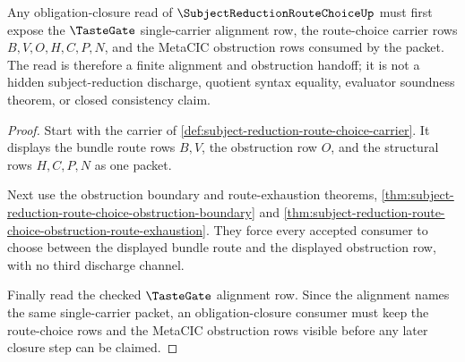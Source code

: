 \begin{theorem}
\label{thm:subject-reduction-route-choice-tastegate-obligation-handoff}
Any obligation-closure read of $\SubjectReductionRouteChoiceUp$ must first expose the $\TasteGate$ single-carrier alignment row, the route-choice carrier rows $B,V,O,H,C,P,N$, and the MetaCIC obstruction rows consumed by the packet. The read is therefore a finite alignment and obstruction handoff; it is not a hidden subject-reduction discharge, quotient syntax equality, evaluator soundness theorem, or closed consistency claim.
\end{theorem}
\begin{proof}
Start with the carrier of \autoref{def:subject-reduction-route-choice-carrier}. It displays the bundle route rows $B,V$, the obstruction row $O$, and the structural rows $H,C,P,N$ as one packet.

Next use the obstruction boundary and route-exhaustion theorems, \autoref{thm:subject-reduction-route-choice-obstruction-boundary} and \autoref{thm:subject-reduction-route-choice-obstruction-route-exhaustion}. They force every accepted consumer to choose between the displayed bundle route and the displayed obstruction row, with no third discharge channel.

Finally read the checked $\TasteGate$ alignment row. Since the alignment names the same single-carrier packet, an obligation-closure consumer must keep the route-choice rows and the MetaCIC obstruction rows visible before any later closure step can be claimed.
\end{proof}


\begin{closurestatus}{\SubjectReductionRouteChoiceUp}
  \theoryclosure{\obligationClosure}
  \formalstatus{\unformalizedV}
\end{closurestatus}
